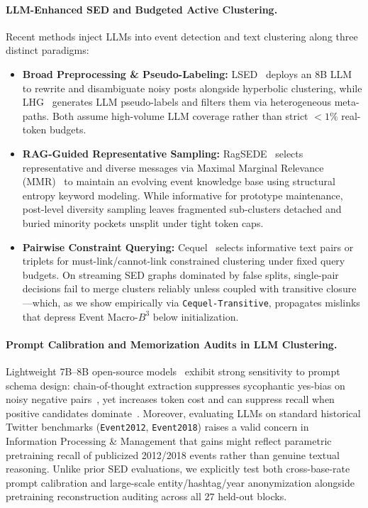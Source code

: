 \paragraph{LLM-Enhanced SED and Budgeted Active Clustering.}
Recent methods inject LLMs into event detection and text clustering along three distinct paradigms:
\begin{itemize}
    \item \textbf{Broad Preprocessing \& Pseudo-Labeling:} LSED~\citep{qiu2025lsed} deploys an 8B LLM to rewrite and disambiguate noisy posts alongside hyperbolic clustering, while LHG~\citep{qiu2026lhg} generates LLM pseudo-labels and filters them via heterogeneous meta-paths. Both assume high-volume LLM coverage rather than strict $<1\%$ real-token budgets.
    \item \textbf{RAG-Guided Representative Sampling:} RagSEDE~\citep{liu2026ragsede} selects representative and diverse messages via Maximal Marginal Relevance (MMR)~\citep{carbonell1998mmr} to maintain an evolving event knowledge base using structural entropy keyword modeling. While informative for prototype maintenance, post-level diversity sampling leaves fragmented sub-clusters detached and buried minority pockets unsplit under tight token caps.
    \item \textbf{Pairwise Constraint Querying:} Cequel~\citep{wang2025cequel} selects informative text pairs or triplets for must-link/cannot-link constrained clustering under fixed query budgets. On streaming SED graphs dominated by false splits, single-pair decisions fail to merge clusters reliably unless coupled with transitive closure---which, as we show empirically via \texttt{Cequel-Transitive}, propagates mislinks that depress Event Macro-$B^3$ below initialization.
\end{itemize}

\paragraph{Prompt Calibration and Memorization Audits in LLM Clustering.}
Lightweight 7B--8B open-source models~\citep{yang2025qwen3,grattafiori2024llama3} exhibit strong sensitivity to prompt schema design: chain-of-thought extraction suppresses sycophantic yes-bias on noisy negative pairs~\citep{wang2025cequel}, yet increases token cost and can suppress recall when positive candidates dominate~\citep{yang2025qwen3}. Moreover, evaluating LLMs on standard historical Twitter benchmarks (\texttt{Event2012}, \texttt{Event2018}) raises a valid concern in Information Processing \& Management that gains might reflect parametric pretraining recall of publicized 2012/2018 events rather than genuine textual reasoning. Unlike prior SED evaluations, we explicitly test both cross-base-rate prompt calibration and large-scale entity/hashtag/year anonymization alongside pretraining reconstruction auditing across all $27$ held-out blocks.

